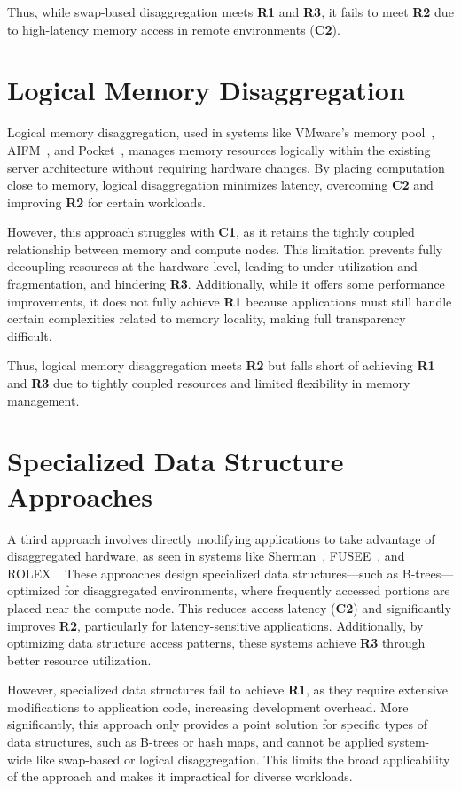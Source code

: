 Thus, while swap-based disaggregation meets \textbf{R1} and \textbf{R3}, it fails to meet \textbf{R2} due to high-latency memory access in remote environments (\textbf{C2}).

\section{Logical Memory Disaggregation}

Logical memory disaggregation, used in systems like VMware’s memory pool~\cite{pool1}, AIFM~\cite{aifm}, and Pocket~\cite{pocket}, manages memory resources logically within the existing server architecture without requiring hardware changes. By placing computation close to memory, logical disaggregation minimizes latency, overcoming \textbf{C2} and improving \textbf{R2} for certain workloads.

However, this approach struggles with \textbf{C1}, as it retains the tightly coupled relationship between memory and compute nodes. This limitation prevents fully decoupling resources at the hardware level, leading to under-utilization and fragmentation, and hindering \textbf{R3}. Additionally, while it offers some performance improvements, it does not fully achieve \textbf{R1} because applications must still handle certain complexities related to memory locality, making full transparency difficult.

Thus, logical memory disaggregation meets \textbf{R2} but falls short of achieving \textbf{R1} and \textbf{R3} due to tightly coupled resources and limited flexibility in memory management.

\section{Specialized Data Structure Approaches}

A third approach involves directly modifying applications to take advantage of disaggregated hardware, as seen in systems like Sherman~\cite{sherman}, FUSEE~\cite{fusee}, and ROLEX~\cite{rolex}. These approaches design specialized data structures—such as B-trees—optimized for disaggregated environments, where frequently accessed portions are placed near the compute node. This reduces access latency (\textbf{C2}) and significantly improves \textbf{R2}, particularly for latency-sensitive applications. Additionally, by optimizing data structure access patterns, these systems achieve \textbf{R3} through better resource utilization.

However, specialized data structures fail to achieve \textbf{R1}, as they require extensive modifications to application code, increasing development overhead. More significantly, this approach only provides a point solution for specific types of data structures, such as B-trees or hash maps, and cannot be applied system-wide like swap-based or logical disaggregation. This limits the broad applicability of the approach and makes it impractical for diverse workloads.

